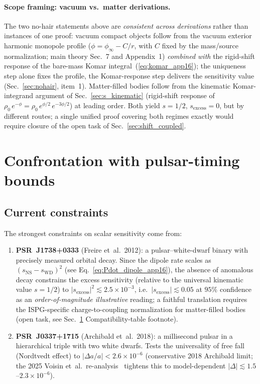 \documentclass[11pt]{article}
\begin{document}
\paragraph{Scope framing: vacuum vs.\ matter derivations.}
The two no-hair statements above are \emph{consistent
across derivations} rather than instances of one proof:
vacuum compact objects follow from the vacuum exterior
harmonic monopole profile
($\phi=\phi_\infty - C/r$, with $C$ fixed by the
mass/source normalization; main theory Sec.~7 and
Appendix~1) \emph{combined with} the
rigid-shift response of the bare-mass Komar
integral~(\ref{eq:komar_app16}); the uniqueness step
alone fixes the profile, the Komar-response step
delivers the sensitivity value (Sec.~\ref{sec:nohair},
item~1).  Matter-filled bodies follow from the kinematic
Komar-integrand argument of Sec.~\ref{sec:s_kinematic}
(rigid-shift response of $\rho_0\,e^{-\phi}=\rho_0\,
e^{\phi/2}\,e^{-3\phi/2}$) at leading order.
Both yield $s=1/2$, $s_{\mathrm{excess}}=0$, but by
different routes; a single unified proof covering both
regimes exactly would require closure of the open task
of Sec.~\ref{sec:shift_coupled}.

\section{Confrontation with pulsar-timing bounds}
\label{sec:bounds}

\subsection{Current constraints}

The strongest constraints on scalar sensitivity come from:
\begin{enumerate}
\item \textbf{PSR~J1738+0333} (Freire et~al.\ 2012):
  a pulsar--white-dwarf binary with precisely measured
  orbital decay.  Since the dipole rate scales as
  $(s_{\mathrm{NS}}-s_{\mathrm{WD}})^{2}$ (see
  Eq.~\ref{eq:Pdot_dipole_app16}), the absence of anomalous
  decay constrains the excess sensitivity (relative to the
  universal kinematic value $s=1/2$) to
  $|s_{\mathrm{excess}}|^2 \lesssim 2.5\times10^{-3}$, i.e.\
  $|s_{\mathrm{excess}}| \lesssim 0.05$ at $95\%$
  confidence as an
  \emph{order-of-magnitude illustrative} reading; a
  faithful translation requires the ISPG-specific
  charge-to-coupling normalization for matter-filled
  bodies (open task, see Sec.~\ref{sec:bounds}
  Compatibility-table footnote).

\item \textbf{PSR~J0337+1715} (Archibald et~al.\ 2018):
  a millisecond pulsar in a hierarchical triple with two
  white dwarfs.  Tests the universality of free fall
  (Nordtvedt effect) to
  $|\Delta a/a| < 2.6\times10^{-6}$ (conservative 2018
  Archibald limit; the 2025 Voisin et~al.\
  re-analysis~\cite{Voisin2025} tightens this to
  model-dependent
  $|\Delta|\lesssim 1.5$--$2.3\times10^{-6}$).
\end{enumerate}
\end{document}
